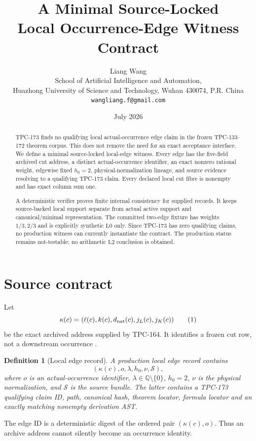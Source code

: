 \documentclass[11pt]{article}
\title{\textbf{A Minimal Source-Locked}\\
\textbf{Local Occurrence-Edge Witness Contract}}
\author{Liang Wang\\
School of Artificial Intelligence and Automation,\\
Huazhong University of Science and Technology, Wuhan 430074, P.R. China\\
\texttt{wangliang.f@gmail.com}}
\date{July 2026}
\newtheorem{definition}[theorem]{Definition}
\newcommand{\Lzero}{\mathrm{L0}}
\newcommand{\Ltwo}{\mathrm{L2}}
\begin{document}
\maketitle

\begin{abstract}
TPC-173 finds no qualifying local actual-occurrence edge claim in the
frozen TPC-133--172 theorem corpus.  This does not remove the need for an
exact acceptance interface.  We define a minimal source-locked local-edge
witness.  Every edge has the five-field archived cut address, a distinct
actual-occurrence identifier, an exact nonzero rational weight, edgewise
fixed \(h_0=2\), physical-normalization lineage, and source evidence resolving
to a qualifying TPC-173 claim.  Every declared local cut fibre is nonempty
and has exact column sum one.

A deterministic verifier proves finite internal consistency for supplied
records.  It keeps source-backed local support separate from actual active
support and canonical/minimal representation.  The committed two-edge
fixture has weights \(1/3,2/3\) and is explicitly synthetic \(\Lzero\)
only.  Since TPC-173 has zero qualifying claims, no production witness can
currently instantiate the contract.  The production status remains
not-testable; no arithmetic \(\Ltwo\) conclusion is obtained.
\end{abstract}

\section{Source contract}

Let
\[
 \kappa(c)=(\ell(c),k(c),d_{\rm nat}(c),j_L(c),j_K(c))
\tag{1}\label{eq:key}
\]
be the exact archived address supplied by TPC-164.  It identifies a frozen
cut row, not a downstream occurrence \citep{WangTPC165,WangTPC173}.

\begin{definition}[Local edge record]\label{def:edge}
A production local edge record contains
\[
 (\kappa(c),o,\lambda,h_0,\nu,\mathcal S),
\tag{2}\label{eq:edge}
\]
where \(o\) is an actual-occurrence identifier,
\(\lambda\in\mathbb Q\setminus\{0\}\), \(h_0=2\), \(\nu\) is the physical
normalization, and \(\mathcal S\) is the source bundle.  The latter contains
a TPC-173 qualifying claim ID, path, canonical hash, theorem locator,
formula locator and an exactly matching nonempty derivation AST.
\end{definition}

The edge ID is a deterministic digest of the ordered pair
\((\kappa(c),o)\).  Thus an archive address cannot silently become an
occurrence identity.
\end{document}
